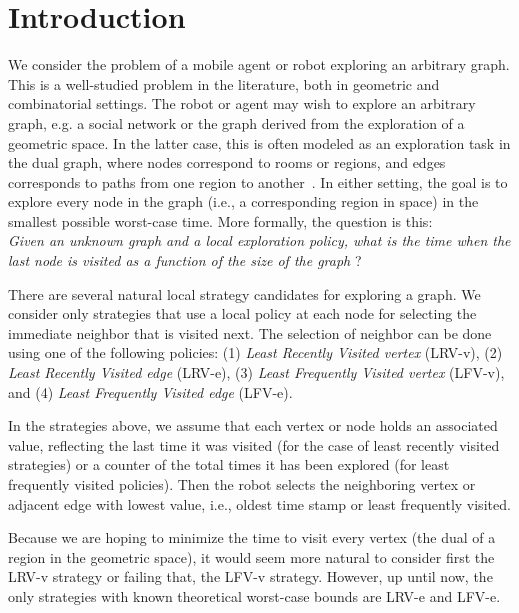 \section{Introduction}
\label{sec:Introduction}

We consider the problem of a mobile agent or robot exploring an arbitrary graph.
This is a well-studied problem in the literature, both in geometric and combinatorial
settings. The robot or agent may wish to explore an arbitrary graph, e.g.
a social network or the graph derived from the exploration of a geometric space.
In the latter case, this is often modeled as an exploration task
in the dual graph, where nodes correspond to rooms or regions, and edges corresponds
to paths from one region to another~\cite{bfk+-tueur-13,flm+-prssr-14,lbf+-estmr-14}.
In either setting, the goal is to explore every node in the graph (i.e., a
corresponding region in space) in the smallest possible worst-case time.
More formally, the question is this: \\
\emph{Given an unknown graph  and a local exploration
policy, what is the time when the last node is visited as a function of
the size of the graph }?





There are several natural local strategy candidates for exploring a graph.
We consider only strategies that use a local policy at each node
for selecting the immediate neighbor that is visited next.
The selection of neighbor can be done using one of the following policies:
(1) {\em Least Recently Visited vertex} (LRV-v), (2) {\em Least Recently Visited edge} (LRV-e),
(3) {\em Least Frequently Visited vertex} (LFV-v), and (4) {\em Least Frequently Visited edge} (LFV-e).


In the strategies above, we assume that each vertex or node holds an associated value,
reflecting the last time it was visited (for the case of least recently visited strategies)
or a counter of the total times it has been explored (for least frequently visited
policies). Then the robot selects the neighboring vertex or adjacent edge
with lowest value, i.e., oldest time stamp or least frequently visited.

Because we are hoping to minimize the time to visit every vertex (the dual of a region
in the geometric space), it would seem
more natural to consider first the LRV-v strategy or failing that, the LFV-v strategy.
However, up until now, the only strategies with known theoretical worst-case
bounds are LRV-e and LFV-e.

